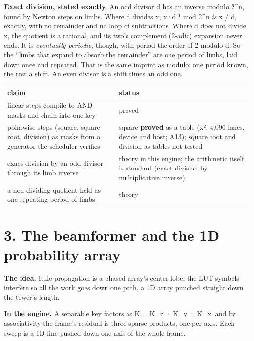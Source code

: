 \textbf{Exact division, stated exactly.} An odd divisor d has an inverse modulo 2\textasciicircum{}n, found by Newton steps on limbs. Where d divides x, x·d⁻¹ mod 2\textasciicircum{}n \emph{is} x / d, exactly, with no remainder and no loop of subtractions. Where d does not divide x, the quotient is a rational, and its two's complement (2-adic) expansion never ends. It is \emph{eventually periodic}, though, with period the order of 2 modulo d. So the “limbs that expand to absorb the remainder” are one period of limbs, laid down once and repeated. That is the same imprint as modulo: one period known, the rest a shift. An even divisor is a shift times an odd one.

{\small
\setlength{\tabcolsep}{6pt}
\begin{longtable}{>{\RaggedRight\arraybackslash}p{}>{\RaggedRight\arraybackslash}p{}}
\toprule
claim & status \\
\midrule
\endhead
linear steps compile to AND masks and chain into one key & proved \\
pointwise steps (square, square root, division) as masks from a generator the scheduler verifies & square \textbf{proved} as a table (x², 4,096 lanes, device and host; A13); square root and division as tables not tested \\
exact division by an odd divisor through its limb inverse & theory in this engine; the arithmetic itself is standard (exact division by multiplicative inverse) \\
a non-dividing quotient held as one repeating period of limbs & theory \\
\bottomrule
\end{longtable}
}

\section{\texorpdfstring{3. The beamformer and the 1D probability array}{3. The beamformer and the 1D probability array}}

\textbf{The idea.} Rule propagation is a phased array's center lobe: the LUT symbols interfere so all the work goes down one path, a 1D array punched straight down the tower's length.

\textbf{In the engine.} A separable key factors as K = K\_\allowbreak{}z · K\_\allowbreak{}y · K\_\allowbreak{}x, and by associativity the frame's residual is three sparse products, one per axis. Each sweep is a 1D line pushed down one axis of the whole frame.

